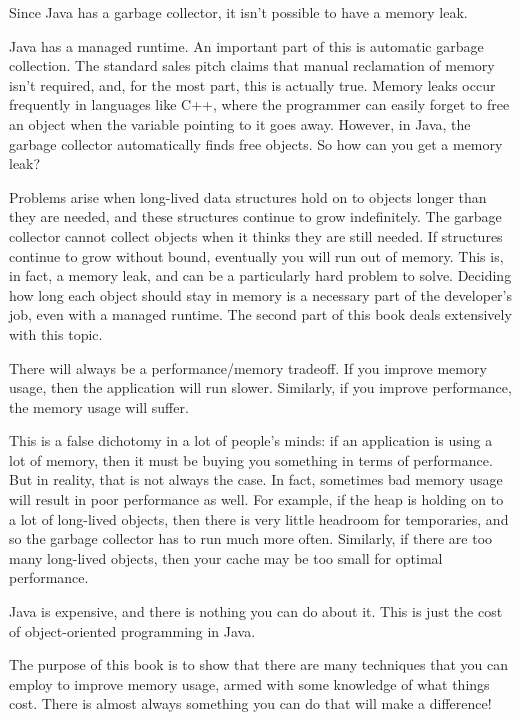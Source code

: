 {Since Java has a garbage collector, it isn't possible
to have a memory leak.
}

Java has a managed runtime. An important
part of this is automatic garbage collection. The standard sales pitch
claims that manual reclamation of memory isn't required, and, for
the most part, this is actually true. Memory leaks occur frequently in
languages like C++, where the programmer can easily forget to free an
object when the variable pointing to it goes away.  However, in Java, the
garbage collector automatically finds free objects. So how can you get a
memory leak?

Problems arise when long-lived data
structures hold on to objects longer than they are needed, and these structures
continue to grow indefinitely. The garbage collector cannot collect objects
when it thinks they are still needed. If structures continue to grow without
bound, eventually you will run out of memory. This is, in fact, a memory leak, 
and can be a particularly hard problem to solve. Deciding how long each object
should stay in memory is a necessary part of the developer's job, even with a
managed runtime. The second part of this book deals extensively with
this topic.

{There will always be a performance/memory tradeoff. If you improve memory
usage, then the application will run slower. 
Similarly, if you improve performance, the memory usage will suffer.
} 

This is a false dichotomy in a lot of people's minds: if an application is
using a lot of memory, then it must be buying you something in terms of performance. 
But in reality, that is not always the case. In fact, sometimes bad memory usage will
result in poor performance as well. For example, if 
the heap is holding on to a lot of long-lived objects, then there is very little
headroom for temporaries, and so the garbage collector has to run much more
often.  Similarly, if there are too many long-lived objects, then your cache may
be too small for optimal performance.

{Java is expensive, and there is nothing you can do about it.
This is just the cost of object-oriented programming in Java.
}

The purpose of this book is to show that there are
many techniques that you can employ to improve memory usage, armed with some
knowledge of what things cost. There is almost always something you can do that
will make a difference!



